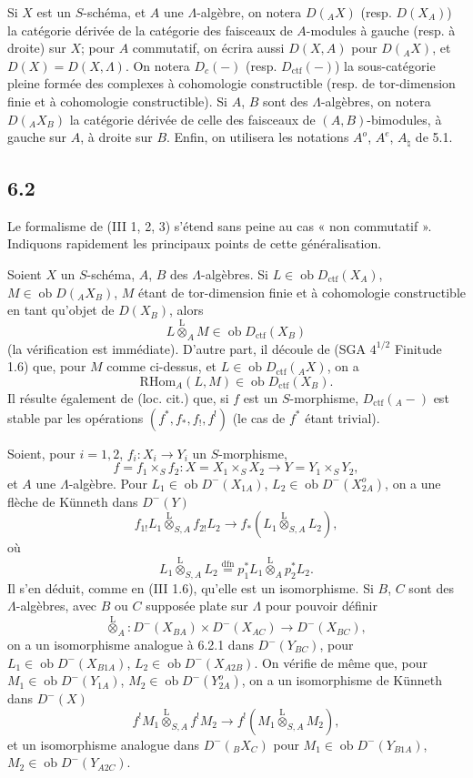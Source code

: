 \documentclass[11pt]{article}
\providecommand{\RHom}{\mathrm{RHom}}
\providecommand{\lten}{\overset{\mathrm L}{\otimes}}
\providecommand{\Ob}{\operatorname{ob}}
\providecommand{\RHom}{\mathrm{RHom}}
\providecommand{\lten}{\overset{\mathrm L}{\otimes}}
\providecommand{\RHom}{\mathrm R\mathcal{H}om}
\providecommand{\lten}{\overset{\mathrm L}{\otimes}}
\providecommand{\Ob}{\operatorname{ob}}
\providecommand{\lten}{\overset{\mathrm L}{\otimes}}
\providecommand{\lten}{\overset{\mathrm L}{\otimes}}
\providecommand{\Ob}{\operatorname{Ob}}
\providecommand{\lten}{\overset{\mathrm L}{\otimes}}
\providecommand{\RHom}{\mathrm{RHom}}
\providecommand{\Ob}{\operatorname{ob}}
\providecommand{\Ob}{\operatorname{Ob}}
\providecommand{\lten}{\overset{\mathrm L}{\otimes}}
\begin{document}
Si $X$ est un $S$-schéma, et $A$ une $\Lambda$-algèbre, on notera $D({}_AX)$ (resp. $D(X_A)$) la catégorie dérivée de la catégorie des faisceaux de $A$-modules à gauche (resp. à droite) sur $X$; pour $A$ commutatif, on écrira aussi $D(X,A)$ pour $D({}_AX)$, et $D(X)=D(X,\Lambda)$. On notera $D_c(-)$ (resp. $D_{\mathrm{ctf}}(-)$) la sous-catégorie pleine formée des complexes à cohomologie constructible (resp. de tor-dimension finie et à cohomologie constructible). Si $A$, $B$ sont des $\Lambda$-algèbres, on notera $D({}_AX_B)$ la catégorie dérivée de celle des faisceaux de $(A,B)$-bimodules, à gauche sur $A$, à droite sur $B$. Enfin, on utilisera les notations $A^o$, $A^e$, $A_{\natural}$ de 5.1.

\subsection*{6.2}
Le formalisme de (III 1, 2, 3) s'étend sans peine au cas « non commutatif ». Indiquons rapidement les principaux points de cette généralisation.

Soient $X$ un $S$-schéma, $A$, $B$ des $\Lambda$-algèbres. Si $L\in\Ob D_{\mathrm{ctf}}(X_A)$, $M\in\Ob D({}_AX_B)$, $M$ étant de tor-dimension finie et à cohomologie constructible en tant qu'objet de $D(X_B)$, alors
\[
L\lten_A M\in\Ob D_{\mathrm{ctf}}(X_B)
\]
(la vérification est immédiate). D'autre part, il découle de (SGA $4^{1/2}$ Finitude 1.6) que, pour $M$ comme ci-dessus, et $L\in\Ob D_{\mathrm{ctf}}({}_AX)$, on a
\[
\RHom_A(L,M)\in\Ob D_{\mathrm{ctf}}(X_B).
\]
Il résulte également de (loc. cit.) que, si $f$ est un $S$-morphisme, $D_{\mathrm{ctf}}({}_A-)$ est stable par les opérations $(f^*,f_*,f_!,f^!)$ (le cas de $f^*$ étant trivial).

Soient, pour $i=1,2$, $f_i:X_i\to Y_i$ un $S$-morphisme,
\[
f=f_1\times_S f_2:X=X_1\times_SX_2\longrightarrow Y=Y_1\times_SY_2,
\]
et $A$ une $\Lambda$-algèbre. Pour $L_1\in\Ob D^-(X_{1A})$, $L_2\in\Ob D^-(X_{2A}^o)$, on a une flèche de Künneth dans $D^-(Y)$
\begin{equation}
f_{1!}L_1\lten_{S,A}f_{2!}L_2
\longrightarrow
f_*(L_1\lten_{S,A}L_2),
\tag{6.2.1}
\end{equation}
où
\[
L_1\lten_{S,A}L_2
\stackrel{\mathrm{dfn}}{=}p_1^*L_1\lten_Ap_2^*L_2.
\]
Il s'en déduit, comme en (III 1.6), qu'elle est un isomorphisme. Si $B$, $C$ sont des $\Lambda$-algèbres, avec $B$ ou $C$ supposée plate sur $\Lambda$ pour pouvoir définir
\[
\lten_A:D^-(X_{BA})\times D^-(X_{AC})\longrightarrow D^-(X_{BC}),
\]
on a un isomorphisme analogue à 6.2.1 dans $D^-(Y_{BC})$, pour $L_1\in\Ob D^-(X_{B1A})$, $L_2\in\Ob D^-(X_{A2B})$. On vérifie de même que, pour $M_1\in\Ob D^-(Y_{1A})$, $M_2\in\Ob D^-(Y_{2A}^o)$, on a un isomorphisme de Künneth dans $D^-(X)$
\begin{equation}
f^!M_1\lten_{S,A}f^!M_2
\longrightarrow
f^!(M_1\lten_{S,A}M_2),
\tag{6.2.2}
\end{equation}
et un isomorphisme analogue dans $D^-({}_B X_C)$ pour $M_1\in\Ob D^-(Y_{B1A})$, $M_2\in\Ob D^-(Y_{A2C})$.
\end{document}

